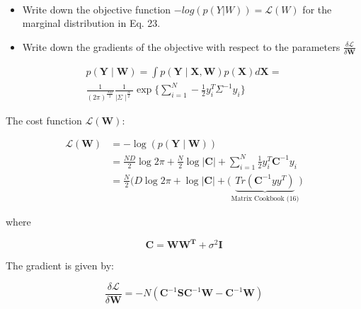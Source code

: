 \documentclass[12pt]{article}
\newenvironment{question}[2][Question]{\begin{trivlist}
\kern10pt
\item[\hskip \labelsep {\bfseries #1}\hskip \labelsep {\bfseries #2.}]}{\end{trivlist}}
\newcommand*{\answer}{%
  \par
  \kern1pt
  \begingroup
    \centering
    \raisebox{.2\baselineskip}{%
      \textcolor{gray}{
	    \rule{.6667\linewidth}{.1pt}%
      }
    }%
    \par
  \kern8pt
  \endgroup
}
\begin{document}
\begin{question}{19}
$ $
\begin{itemize}
\item Write down the objective function $-log(p(Y|W)) = \mathcal{L}(W)$ for the marginal distribution in Eq. 23.
\item Write down the gradients of the objective with respect to the parameters $\frac{\delta\mathcal{L}}{\delta\boldsymbol{W}}$
\end{itemize}
\answer

\begin{align}
p(\boldsymbol{Y} \mid \boldsymbol{W}) = \int p(\boldsymbol{Y} \mid \boldsymbol{X,W})p(\boldsymbol{X})d\boldsymbol{X} =
\\
\frac{1}{(2 \pi)^{\frac{ND}{2}}} \frac{1}{\mid \Sigma \mid^{\frac{N}{2}}} \exp \Big\{ {\sum_{i=1}^{N}} - \frac{1}{2} y_i^T \Sigma^{-1} y_i \Big\}
\end{align}

The cost function $\mathcal{L}(\boldsymbol{W})$:

\begin{equation}
\begin{split}
\mathcal{L}(\boldsymbol{W}) &= - \log(p(\boldsymbol{Y \mid W}))
\\
&= \frac{ND}{2} \log 2\pi + \frac{N}{2} \log \vert \boldsymbol{C} \vert + \sum_{i=1}^N \frac{1}{2} y_i^T \boldsymbol{C}^{-1} y_i
\\
&= \frac{N}{2} \Big(D \log 2 \pi + \log \vert \boldsymbol{C} \vert + (\underbrace{Tr(\boldsymbol{C}^{-1} yy^T)}_{\text{Matrix Cookbook (16)}} \Big)
\end{split}
\end{equation}

where

\begin{equation}
\boldsymbol{C} = \boldsymbol{WW^T} + \sigma^2 \boldsymbol{I}
\end{equation}

The gradient is given by:

\begin{equation}
\frac{\delta\mathcal{L}}{\delta\boldsymbol{W}} = - N(\boldsymbol{C}^{-1}\boldsymbol{S}\boldsymbol{C}^{-1}\boldsymbol{W} - \boldsymbol{C}^{-1}\boldsymbol{W})
\end{equation}
\end{question}
\end{document}
